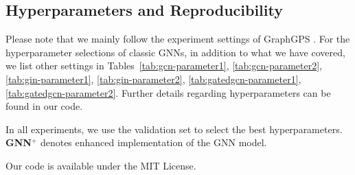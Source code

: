 \subsection{Hyperparameters and Reproducibility} 

Please note that we mainly follow the experiment settings of GraphGPS \cite{rampavsek2022recipe,tonshoff2023did}. For the hyperparameter selections of classic GNNs, in addition to what we have covered, we list other settings in Tables~\ref{tab:gcn-parameter1}, \ref{tab:gcn-parameter2}, \ref{tab:gin-parameter1}, \ref{tab:gin-parameter2}, \ref{tab:gatedgcn-parameter1}, \ref{tab:gatedgcn-parameter2}. Further details regarding hyperparameters can be found in our code.

In all experiments, we use the validation set to select the best hyperparameters. \textbf{GNN$^+$} denotes enhanced implementation of the GNN model. 

Our code is available under the MIT License.


